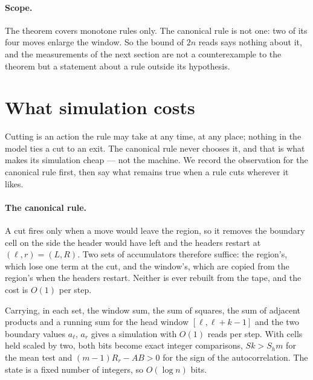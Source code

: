 \documentclass[11pt]{article}
\begin{document}
\paragraph{Scope.} The theorem covers monotone rules only. The canonical rule is not one: two of
its four moves enlarge the window. So the bound of $2n$ reads says nothing about it, and the
measurements of the next section are not a counterexample to the theorem but a statement about a
rule outside its hypothesis.

\section{What simulation costs}\label{sec:cost}

Cutting is an action the rule may take at any time, at any place; nothing in the model ties a cut to
an exit. The canonical rule never chooses it, and that is what makes its simulation cheap --- not the
machine. We record the observation for the canonical rule first, then say what remains true when a
rule cuts wherever it likes.

\paragraph{The canonical rule.} A cut fires only when a move would leave the region, so it removes the
boundary cell on the side the header would have left and the headers restart at $(\ell,r)=(L,R)$. Two
sets of accumulators therefore suffice: the region's, which lose one term at the cut, and the
window's, which are copied from the region's when the headers restart. Neither is ever rebuilt from
the tape, and the cost is $O(1)$ per step.

Carrying, in each set, the window sum, the sum of squares, the sum of adjacent products and a running sum for the head window $[\ell,\ell+k-1]$ and the two
boundary values $a_\ell$, $a_r$ gives a simulation with $O(1)$ reads per step. With cells held scaled
by two, both bits become exact integer comparisons, $Sk>S_hm$ for the mean test and $(m-1)R_r-AB>0$
for the sign of the autocorrelation. The state is a fixed number of integers, so $O(\log n)$ bits.
\end{document}
